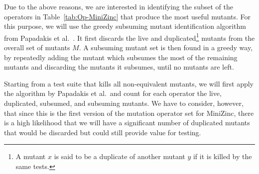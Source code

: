 \begin{comment}

While these operators target different possible defects, they also incur a cost in the mutation testing process: their mutants need to be generated, and test cases have to be run against them. It is known from the literature that \emph{selective mutation testing} (using only some of the mutants) can have similar testing effectiveness as the full set of mutation operators, for a fraction of the cost~\cite{Mresa99OpMut}.

The literature has also recognised that not all mutants are of the same value: some mutants are killed by most test cases we can come up with, whereas others require very specific test cases, and others are equivalent to the test program. Specifically, Papadakis et al.\ argued against using \emph{subsumed mutants} on experimental studies based on mutation testing, as they could skew the results~\cite{papadakis_threats_2016}. According to Ammann et al.~\cite{ammann_establishing_2014}, mutant $x$ dynamically subsumes mutant $y$ if $x$ has been killed and every test that kills $x$ also kills $y$. These subsumed mutants are redundant for the purposes of designing test cases, and can be safely discarded (e.g. by refining the definition of the mutation operator, or not using it at all).

\end{comment}

Due to the above reasons, we are interested in identifying the subset of the operators in Table~\ref{tab:Op-MiniZinc} that produce the most useful mutants.
For this purpose, we will use the greedy subsuming mutant identification algorithm from Papadakis et al.~\cite{papadakis_threats_2016}.
It first discards the live and duplicated\footnote{A mutant $x$ is said to be a duplicate of another mutant $y$ if it is killed by the same tests.} mutants from the overall set of mutants $M$.
A subsuming mutant set is then found in a greedy way, by repeatedly adding the mutant which subsumes the most of the remaining mutants and discarding the mutants it subsumes, until no mutants are left.

Starting from a test suite that kills all non-equivalent mutants, we will first apply the algorithm by Papadakis et al.\ and count for each operator the live, duplicated, subsumed, and subsuming mutants.
We have to consider, however, that since this is the first version of the mutation operator set for Mini\-Zinc, there is a high likelihood that we will have a significant number of duplicated mutants that would be discarded but could still provide value for testing.

